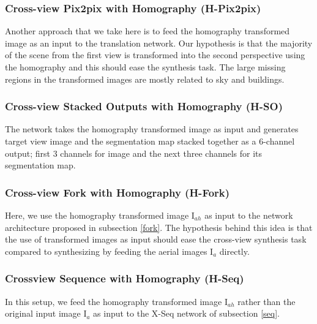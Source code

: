 \documentclass[times,twocolumn,final,authoryear]{elsarticle_modified}
\begin{document}
\vspace{-5pt}

\subsubsection{Cross-view Pix2pix with Homography (H-Pix2pix)}
Another approach that we take here is to feed the homography transformed image as an input to the translation network. 
Our hypothesis is that the majority of the scene from the first view is transformed into the second perspective using the homography and this should ease the synthesis task. The large missing regions in the transformed images are mostly related to sky and buildings.

\vspace{-5pt}

\subsubsection{Cross-view Stacked Outputs with Homography (H-SO)} 
The network takes the homography transformed image  as input and generates target view image and the segmentation map stacked together as a 6-channel output; first 3 channels for image and the next three channels for its segmentation map. 


\vspace{-5pt}

\subsubsection{Cross-view Fork with Homography (H-Fork)}
Here, we use the homography transformed image I$_{ah}$ as input to the network architecture proposed in subsection \ref{fork}. The hypothesis behind this idea is that the use of transformed images as input should ease the cross-view synthesis task compared to synthesizing by feeding the aerial images I${_a}$ directly.

\vspace{-5pt}

\subsubsection{Crossview Sequence with Homography (H-Seq)}
In this setup, we feed the homography transformed image I$_{ah}$ rather than the original input image I$_{a}$ as input to the X-Seq network of subsection \ref{seq}.

\vspace{-5pt}
\end{document}

